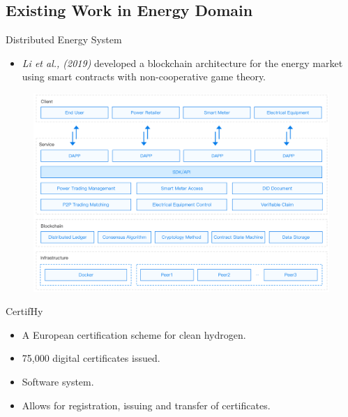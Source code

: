 \subsection{Existing Work in Energy Domain}
\begin{frame}{Distributed Energy System}
    \begin{itemize}
        \item \textit{Li et al., (2019)} developed a blockchain
              architecture for the energy market using smart contracts
              with non-cooperative game theory.
    \end{itemize}
    \begin{figure}
        \includegraphics[height=0.5\textheight, width=\linewidth,
            keepaspectratio]{photos/blockenergy.png}
        \centering
    \end{figure}
\end{frame}
\begin{frame}{CertifHy}
    \begin{itemize}
        \item A European certification scheme for clean hydrogen.
        \item 75,000 digital certificates issued.
        \item Software system.
        \item Allows for registration, issuing and transfer of certificates.
    \end{itemize}
\end{frame}
